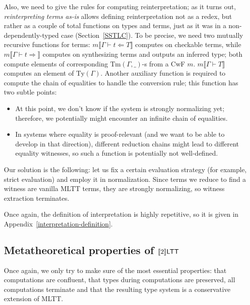 Also, we need to give the rules for computing
reinterpretation; as it turns out,
\textit{reinterpreting terms as-is} allows defining
reinterpretation not as a redex, but rather as a couple
of total functions on types and terms, just as it was in
a non-dependently-typed case (Section~\ref{SSTLC}). To
be precise, we need two mutually recursive functions
for terms:
$m\llbracket\Gamma\vdash t\Leftarrow T\rrbracket$
computes on checkable terms, while $m\llbracket\Gamma
\vdash t\Rightarrow\rrbracket$ computes on synthesizing
terms and outputs an inferred type; both compute
elements of corresponding $\mathrm{Tm}(\Gamma,\_)$-s
from a CwF $m$. $m\llbracket\Gamma\vdash T\rrbracket$
computes an element of $\mathrm{Ty}(\Gamma)$. Another
auxiliary function is required to compute the chain of
equalities to handle the conversion rule; this function has
two subtle points:

\begin{itemize}
    \item At this point, we don't know if the system is
        strongly normalizing yet; therefore, we
        potentially might encounter an infinite chain
        of equalities.
    \item In systems where equality is proof-relevant
        (and we want to be able to develop in that
        direction), different reduction chains might
        lead to different equality witnesses, so such a
        function is potentially not well-defined.
\end{itemize}

Our solution is the following: let us fix a certain
evaluation strategy (for example, strict evaluation)
and employ it in normalization. Since terms we reduce
to find a witness are vanilla MLTT terms, they are
strongly normalizing, so witness extraction terminates.

Once again, the definition of interpretation is highly
repetitive, so it is given in
Appendix~\ref{interpretation-definition}.

\subsection{Metatheoretical properties of
\texorpdfstring{$\llbracket 2\rrbracket\mathsf{LTT}$}{[[2]]LTT}}
\label{twoLTT-properties}

Once again, we only try to make sure of the most
essential properties: that computations are confluent,
that types during computations are preserved, all
computations terminate and that the resulting type system
is a conservative extension of MLTT.

